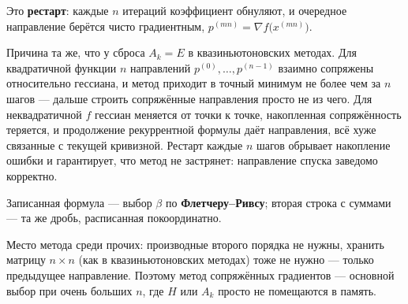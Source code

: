 \begin{idea}[title={Что означает $\beta^{(mn)} = 0$}]
Это \textbf{рестарт}: каждые $n$ итераций коэффициент обнуляют, и очередное
направление берётся чисто градиентным, $p^{(mn)} = \nabla f\big(x^{(mn)}\big)$.

Причина та же, что у сброса $A_k = E$ в квазиньютоновских методах. Для
квадратичной функции $n$ направлений $p^{(0)}, \dots, p^{(n-1)}$ взаимно
сопряжены относительно гессиана, и метод приходит в точный минимум не более
чем за $n$ шагов — дальше строить сопряжённые направления просто не из чего.
Для неквадратичной $f$ гессиан меняется от точки к точке, накопленная
сопряжённость теряется, и продолжение рекуррентной формулы даёт направления,
всё хуже связанные с текущей кривизной. Рестарт каждые $n$ шагов обрывает
накопление ошибки и гарантирует, что метод не застрянет: направление спуска
заведомо корректно.

Записанная формула — выбор $\beta$ по \textbf{Флетчеру--Ривсу}; вторая строка
с суммами — та же дробь, расписанная покоординатно.
\end{idea}

\begin{idea}
Место метода среди прочих: производные второго порядка не нужны, хранить
матрицу $n \times n$ (как в квазиньютоновских методах) тоже не нужно — только
предыдущее направление. Поэтому метод сопряжённых градиентов — основной выбор
при очень больших $n$, где $H$ или $A_k$ просто не помещаются в память.
\end{idea}
